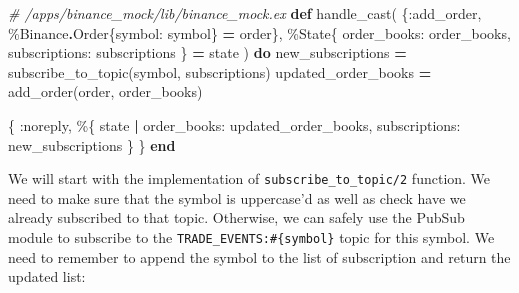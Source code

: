 \documentclass[
  oneside]{book}
\newenvironment{Shaded}{\begin{snugshade}}{\end{snugshade}}
\newcommand{\CommentTok}[1]{\textcolor[rgb]{0.56,0.35,0.01}{\textit{#1}}}
\newcommand{\ConstantTok}[1]{\textcolor[rgb]{0.00,0.00,0.00}{#1}}
\newcommand{\KeywordTok}[1]{\textcolor[rgb]{0.13,0.29,0.53}{\textbf{#1}}}
\newcommand{\NormalTok}[1]{#1}
\newcommand{\OperatorTok}[1]{\textcolor[rgb]{0.81,0.36,0.00}{\textbf{#1}}}
\newcommand{\VariableTok}[1]{\textcolor[rgb]{0.00,0.00,0.00}{#1}}
\begin{document}
\begin{Shaded}
\begin{Highlighting}[]
\CommentTok{\# /apps/binance\_mock/lib/binance\_mock.ex}
  \KeywordTok{def}\NormalTok{ handle\_cast(}
\NormalTok{        \{}\VariableTok{:add\_order}\NormalTok{, \%}\ConstantTok{Binance}\OperatorTok{.}\ConstantTok{Order}\NormalTok{\{}\VariableTok{symbol:}\NormalTok{ symbol\} }\OperatorTok{=}\NormalTok{ order\},}
\NormalTok{        \%}\ConstantTok{State}\NormalTok{\{}
          \VariableTok{order\_books:}\NormalTok{ order\_books,}
          \VariableTok{subscriptions:}\NormalTok{ subscriptions}
\NormalTok{        \} }\OperatorTok{=}\NormalTok{ state}
\NormalTok{      ) }\KeywordTok{do}
\NormalTok{    new\_subscriptions }\OperatorTok{=}\NormalTok{ subscribe\_to\_topic(symbol, subscriptions)}
\NormalTok{    updated\_order\_books }\OperatorTok{=}\NormalTok{ add\_order(order, order\_books)}

\NormalTok{    \{}
      \VariableTok{:noreply}\NormalTok{,}
\NormalTok{      \%\{}
\NormalTok{        state}
        \OperatorTok{|} \VariableTok{order\_books:}\NormalTok{ updated\_order\_books,}
          \VariableTok{subscriptions:}\NormalTok{ new\_subscriptions}
\NormalTok{      \}}
\NormalTok{    \}}
  \KeywordTok{end}
\end{Highlighting}
\end{Shaded}

We will start with the implementation of \texttt{subscribe\_to\_topic/2} function. We need to make sure that the symbol is uppercase'd as well as check have we already subscribed to that topic. Otherwise, we can safely use the PubSub module to subscribe to the \texttt{TRADE\_EVENTS:\#\{symbol\}} topic for this symbol.
We need to remember to append the symbol to the list of subscription and return the updated list:
\end{document}
